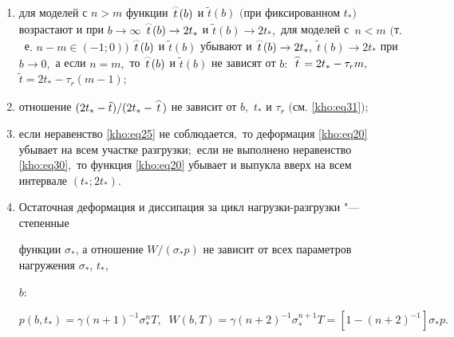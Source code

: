 \begin{theorem}[3]
\begin{enumerate}
\item[\rm 5)] для моделей с $n>m$ функции $\mathord{\buildrel{\lower3pt\hbox{$\scriptscriptstyle\frown$}}\over{t}}(b)$ и $\tilde{t}(b)$ $($при фиксированном $t_\ast)$ возрастают и при $b\to\infty$ $\mathord{\buildrel{\lower3pt\hbox{$\scriptscriptstyle\frown$}}\over{t}}(b)\to2t_\ast$ и $\tilde{t}(b)\to2t_\ast,$ для моделей с~${n<m}$ $($т$.$~е$.$ $n-m\in(- 1;0))$ $\mathord{\buildrel{\lower3pt\hbox{$\scriptscriptstyle\frown$}}\over{t}}(b)$ и $\tilde{t}(b)$ убывают и $\mathord{\buildrel{\lower3pt\hbox{$\scriptscriptstyle\frown$}}\over{t}}(b)\to2t_\ast,$ $\tilde{t}(b)\to2t_\ast$ при $b\to0,$ а если $n=m,$ то $\mathord{\buildrel{\lower3pt\hbox{$\scriptscriptstyle\frown$}}\over{t}}(b)$ и $\tilde{t}(b)$ не зависят от $b{:}$ $\mathord{\buildrel{\lower3pt\hbox{$\scriptscriptstyle\frown$}}\over{t}}=2t_\ast-\tau_rm,$ $\tilde{t}=2t_\ast-\tau_r(m-1);$ 



\item[\rm 6)] отношение $(2t_\ast-\tilde{t})/(2t_\ast-\mathord{\buildrel{\lower3pt\hbox{$\scriptscriptstyle\frown$}}\over{t}})$ не зависит от $b,$ $t_\ast$ и $\tau_r$ $($см$.$ \eqref{kho:eq31}$);$



\item[\rm 7)] если неравенство \eqref{kho:eq25} не соблюдается$,$ то деформация \eqref{kho:eq20} убывает на всем участке разгрузки\/$;$ если не выполнено неравенство \eqref{kho:eq30}$,$ то функция \eqref{kho:eq20} убывает и выпукла вверх на всем интервале $(t_\ast;2t_\ast).$



\item[\rm 8)]  Остаточная деформация и диссипация за цикл нагрузки-разгрузки "--- степенные

функции $\sigma_*$, а отношение $W/ (\sigma_* p )$ не зависит от всех параметров нагружения $\sigma_*$, $t_*$, 

$b{:}$

$$

p ( b , t_* ) = \gamma( n + 1)^{-1} \sigma_*^ n T , \; \;  

W ( b , T ) = \gamma ( n+2)^{-1} \sigma_*^{n+1} T = [1 - ( n +2)^{-1} ]\sigma_ * p .

$$

\end{enumerate}

\end{theorem}



